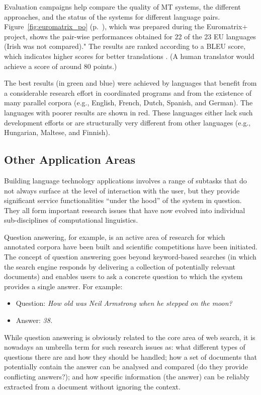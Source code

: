 \begin{multicols}{2}
Evaluation campaigns help compare the quality of MT systems, the different approaches, and the status of the systems for different language pairs.
Figure~\ref{fig:euromatrix_po} (p.~\pageref{fig:euromatrix_po}), which was prepared during the Euromatrix+ project, shows the pair-wise performances obtained for 22 of the 23 EU languages (Irish was not compared)."
The results are ranked according to a BLEU score, which indicates higher scores for better translations \cite{Meta36}.
(A human translator would achieve a score of around 80 points.) 

The best results (in green and blue) were achieved by languages that benefit from a considerable research effort in coordinated programs and from the existence of many parallel corpora (e.g., English, French, Dutch, Spanish, and German).
The languages with poorer results are shown in red.
These languages either lack such development efforts or are structurally very different from other languages (e.g., Hungarian, Maltese, and Finnish).

\subsection{Other Application Areas}
Building language technology applications involves a range of subtasks that do not always surface at the level of interaction with the user, but they provide significant service functionalities ``under the hood'' of the system in question.
They all form important research issues that have now evolved into individual sub-disciplines of computational linguistics. 

Question answering, for example, is an active area of research for which annotated corpora have been built and scientific competitions have been initiated.
The concept of question answering goes beyond keyword-based searches (in which the search engine responds by delivering a collection of potentially relevant documents) and enables users to ask a concrete question to which the system provides a single answer.
For example:
\begin{itemize}
\item[] Question: \textit{How old was Neil Armstrong when he stepped on the moon?}
\item[] Answer: \textit{38.}
\end{itemize}

While question answering is obviously related to the core area of web search, it is nowadays an umbrella term for such research issues as: what different types of questions there are and how they should be handled; how a set of documents that potentially contain the answer can be analysed and compared (do they provide conflicting answers?); and how specific information (the answer) can be reliably extracted from a document without ignoring the context. 


\end{multicols}
